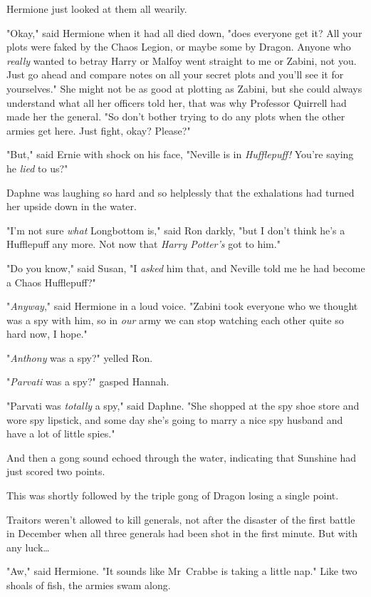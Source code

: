 Hermione just looked at them all wearily.

"Okay," said Hermione when it had all died down, "does everyone get it? All
your plots were faked by the Chaos Legion, or maybe some by Dragon. Anyone who
\emph{really} wanted to betray Harry or Malfoy went straight to me or Zabini,
not you. Just go ahead and compare notes on all your secret plots and you'll
see it for yourselves." She might not be as good at plotting as Zabini, but she
could always understand what all her officers told her, that was why Professor
Quirrell had made her the general. "So don't bother trying to do any plots when
the other armies get here. Just fight, okay? Please?"

"But," said Ernie with shock on his face, "Neville is in \emph{Hufflepuff!}
You're saying he \emph{lied} to us?"

Daphne was laughing so hard and so helplessly that the exhalations had turned
her upside down in the water.

"I'm not sure \emph{what} Longbottom is," said Ron darkly, "but I don't think
he's a Hufflepuff any more. Not now that \emph{Harry Potter's} got to him."

"Do you know," said Susan, "I \emph{asked} him that, and Neville told me he had
become a Chaos Hufflepuff?"

"\emph{Anyway}," said Hermione in a loud voice. "Zabini took everyone who
we thought was a spy with him, so in \emph{our} army we can stop watching each other
quite so hard now, I hope."

"\emph{Anthony} was a spy?" yelled Ron.

"\emph{Parvati} was a spy?" gasped Hannah.

"Parvati was \emph{totally} a spy," said Daphne. "She shopped at the spy shoe
store and wore spy lipstick, and some day she's going to marry a nice spy
husband and have a lot of little spies."

And then a gong sound echoed through the water, indicating that Sunshine had
just scored two points.

This was shortly followed by the triple gong of Dragon losing a single point.

Traitors weren't allowed to kill generals, not after the disaster of the first
battle in December when all three generals had been shot in the first minute.
But with any luck…

"Aw," said Hermione. "It sounds like Mr~Crabbe is taking a little nap."
\later
Like two shoals of fish, the armies swam along.

